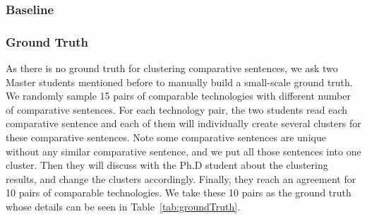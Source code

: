 \subsubsection{Baseline}

\subsubsection{Ground Truth}
\label{sec:clusteringGroundTruth}
As there is no ground truth for clustering comparative sentences, we ask two Master students mentioned before to manually build a small-scale ground truth.
We randomly sample 15 pairs of comparable technologies with different number of comparative sentences.
For each technology pair, the two students read each comparative sentence and each of them will individually create several clusters for these comparative sentences.
Note some comparative sentences are unique without any similar comparative sentence, and we put all those sentences into one cluster.
Then they will discuss with the Ph.D student about the clustering results, and change the clusters accordingly.
Finally, they reach an agreement for 10 pairs of comparable technologies.
We take these 10 pairs as the ground truth whose details can be seen in Table~\ref{tab:groundTruth}.

